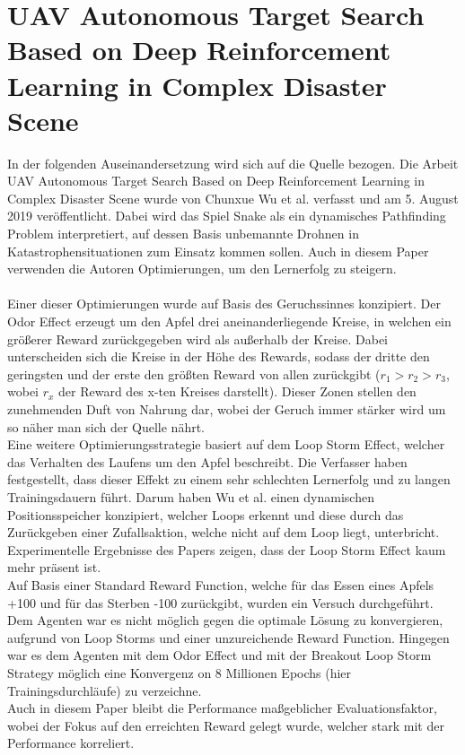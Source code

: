 \section{UAV Autonomous Target Search Based on Deep Reinforcement Learning in Complex Disaster Scene} \label{sec:Paper_2}
In der folgenden Auseinandersetzung wird sich auf die Quelle \cite{UAV} bezogen.
Die Arbeit UAV Autonomous Target Search Based on Deep Reinforcement Learning in Complex Disaster Scene wurde von Chunxue Wu et al. verfasst und am 5. August 2019 veröffentlicht. Dabei wird das Spiel Snake als ein dynamisches Pathfinding Problem interpretiert, auf dessen Basis unbemannte Drohnen in Katastrophensituationen zum Einsatz kommen sollen. Auch in diesem Paper verwenden die Autoren Optimierungen, um den Lernerfolg zu steigern.\\
\\ Einer dieser Optimierungen wurde auf Basis des Geruchssinnes konzipiert. Der Odor Effect erzeugt um den Apfel drei aneinanderliegende Kreise, in welchen ein größerer Reward zurückgegeben wird als außerhalb der Kreise. Dabei unterscheiden sich die Kreise in der Höhe des Rewards, sodass der dritte den geringsten und der erste den größten Reward von allen zurückgibt ($r_1 > r_2 > r_3$, wobei $r_x$ der Reward des x-ten Kreises darstellt). Dieser Zonen stellen den zunehmenden Duft von Nahrung dar, wobei der Geruch immer stärker wird um so näher man sich der Quelle nährt.\\
Eine weitere Optimierungsstrategie basiert auf dem Loop Storm Effect, welcher das Verhalten des Laufens um den Apfel beschreibt. Die Verfasser haben festgestellt, dass dieser Effekt zu einem sehr schlechten Lernerfolg und zu langen Trainingsdauern führt. Darum haben Wu et al. einen dynamischen Positionsspeicher konzipiert, welcher Loops erkennt und diese durch das Zurückgeben einer Zufallsaktion, welche nicht auf dem Loop liegt, unterbricht. Experimentelle Ergebnisse des Papers zeigen, dass der Loop Storm Effect kaum mehr präsent ist.
\\ Auf Basis einer Standard Reward Function, welche für das Essen eines Apfels +100 und für das Sterben -100 zurückgibt, wurden ein Versuch durchgeführt. Dem Agenten war es nicht möglich gegen die optimale Lösung zu konvergieren, aufgrund von Loop Storms und einer unzureichende Reward Function. Hingegen war es dem Agenten mit dem Odor Effect und mit der Breakout Loop Storm Strategy möglich eine Konvergenz on 8 Millionen Epochs (hier Trainingsdurchläufe) zu verzeichne.\\
Auch in diesem Paper bleibt die Performance maßgeblicher Evaluationsfaktor, wobei der Fokus auf den erreichten Reward gelegt wurde, welcher stark mit der Performance korreliert.

